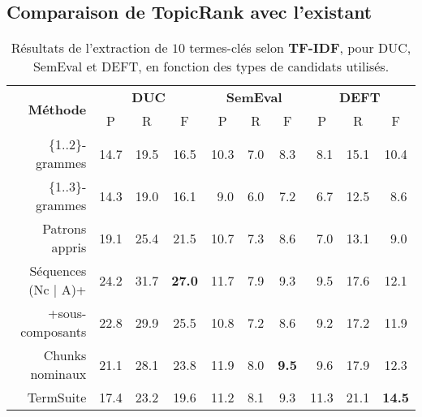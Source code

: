   \subsection{Comparaison de TopicRank avec l'existant}
  \label{subsec:comparaison_de_topicrank_avec_l_existant}
    \begin{table}
      \centering
      \begin{tabular}{@{~~}rc@{~~~}c@{~~~}cc@{~~~}c@{~~~}cc@{~~~}c@{~~~}c@{~~}}
        \toprule
        \multirow{2}{*}[-2pt]{\textbf{Méthode}} & \multicolumn{3}{c}{\textbf{DUC}} & \multicolumn{3}{c}{\textbf{SemEval}} & \multicolumn{3}{c}{\textbf{DEFT}}\\
        \cmidrule(r){2-4}\cmidrule(lr){5-7}\cmidrule(l){8-10}
        & P & R & F & P & R & F & P & R & F\\
        \midrule
        \{1..2\}-grammes & 14.7 & 19.5 & 16.5 & 10.3 & $~~$7.0 & $~~$8.3 & $~~$8.1 & 15.1 & 10.4\\
        \{1..3\}-grammes & 14.3 & 19.0 & 16.1 & $~~$9.0 & $~~$6.0 & $~~$7.2 & $~~$6.7 & 12.5 & $~~$8.6\\
        Patrons appris & 19.1 & 25.4 & 21.5 & 10.7 & $~~$7.3 & $~~$8.6 & $~~$7.0 & 13.1 & $~~$9.0\\
        Séquences (Nc | A)+ & 24.2 & 31.7 & \textbf{27.0} & 11.7 & $~~$7.9 & $~~$9.3 & $~~$9.5 & 17.6 & 12.1\\
        +sous-composants & 22.8 & 29.9 & 25.5 & 10.8 & $~~$7.2 & $~~$8.6 & $~~$9.2 & 17.2 & 11.9\\
        Chunks nominaux & 21.1 & 28.1 & 23.8 & 11.9 & $~~$8.0 & \textbf{$~~$9.5} & $~~$9.6 & 17.9 & 12.3\\
        TermSuite & 17.4 & 23.2 & 19.6 & 11.2 & $~~$8.1 & $~~$9.3 & 11.3 & 21.1 & \textbf{14.5}\\
        \bottomrule
      \end{tabular}
      \caption{Résultats de l'extraction de $10$ termes-clés selon
               \textbf{TF-IDF}, pour DUC, SemEval et DEFT, en fonction des types
               de candidats utilisés. 
               \label{tab:resultats_de_tfidf}}
    \end{table}
